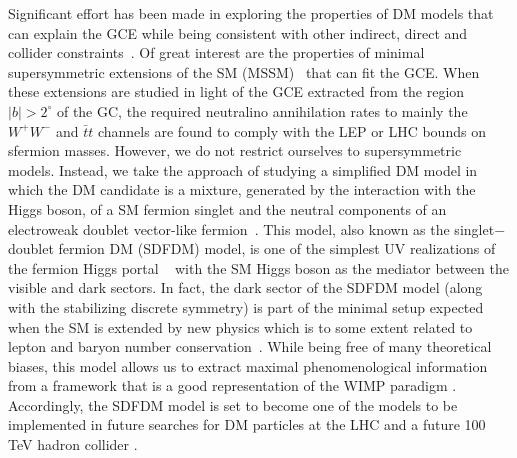 Significant effort has been made in exploring the properties of DM models that can explain the GCE while being consistent with other indirect, direct and collider constraints~\cite{Logan:2010nw,Buckley:2010ve,Zhu:2011dz,Marshall:2011mm,Boucenna:2011hy,Buckley:2011mm,Anchordoqui:2013pta,Buckley:2013sca,Hagiwara:2013qya,Okada:2013bna,Huang:2013apa,Modak:2013jya,Boehm:2014hva,Alves:2014yha,Berlin:2014tja,Agrawal:2014una,Izaguirre:2014vva,Cerdeno:2014cda,Ipek:2014gua,Boehm:2014bia,Ko:2014gha,Abdullah:2014lla,Ghosh:2014pwa,Martin:2014sxa,Basak:2014sza,Berlin:2014pya,Cline:2014dwa,Han:2014nba,Detmold:2014qqa,Wang:2014elb,Chang:2014lxa,Arina:2014yna,Cheung:2014lqa,McDermott:2014rqa,Huang:2014cla,Balazs:2014jla,Ko:2014loa,Okada:2014usa,Ghorbani:2014qpa,Banik:2014eda,Borah:2014ska,Cahill-Rowley:2014ora,Guo:2014gra,Freytsis:2014sua,Heikinheimo:2014xza,Arcadi:2014lta,Richard:2014vfa,Cao:2014efa,Bell:2014xta,Cerdeno:2015ega,Caron:2015wda,Bertoneetal,Freeseetal}.
 Of great interest are the properties of minimal supersymmetric extensions of the SM (MSSM)~\cite{Cheung:2014lqa,Cahill-Rowley:2014ora,Cao:2014efa,Cerdeno:2015ega,Caron:2015wda,Bertoneetal,Freeseetal} that can fit the GCE.
 When these extensions are studied in light of the GCE extracted from the region $|b|>2^\circ$ of the GC, the required neutralino annihilation rates to mainly the $W^+W^-$ and $\bar{t}t$ channels are found to comply with the LEP or LHC bounds on sfermion masses.
However, we do not restrict ourselves to supersymmetric models. Instead, we take the approach of studying a simplified DM model in which the DM candidate is a mixture, generated by the interaction with the Higgs boson, of a SM fermion singlet and the neutral components of an electroweak doublet vector-like fermion~\cite{ArkaniHamed:2005yv,Mahbubani:2005pt,D'Eramo:2007ga,Enberg:2007rp}. This model, also known as the singlet$-$doublet fermion DM (SDFDM) model, is one of the simplest UV realizations of the fermion Higgs portal ~\cite{Patt:2006fw} with the SM Higgs boson as the mediator between the visible and dark sectors. In fact, the dark sector of the SDFDM model (along with the stabilizing discrete symmetry) is part of the minimal setup expected when the SM is extended by new physics which is to some extent related to lepton and baryon number conservation~\cite{Arbelaez:2015ila,Arkani-Hamed:2015vfh}. While being free of many theoretical biases, this  model allows us to extract maximal phenomenological information from a framework that is a good representation of the WIMP paradigm \cite{ArkaniHamed:2005yv,Mahbubani:2005pt,D'Eramo:2007ga,Enberg:2007rp,Cohen:2011ec,Cheung:2013dua,Abe:2014gua,Calibbi:2015nha,Freitas:2015hsa,Abdallah:2015ter}.%
Accordingly, the SDFDM model is set to become one of the models to be implemented in future searches for DM particles at the LHC \cite{Abdallah:2015ter} and a future 100 TeV hadron collider \cite{Gori:2014oua,Arkani-Hamed:2015vfh}.  

